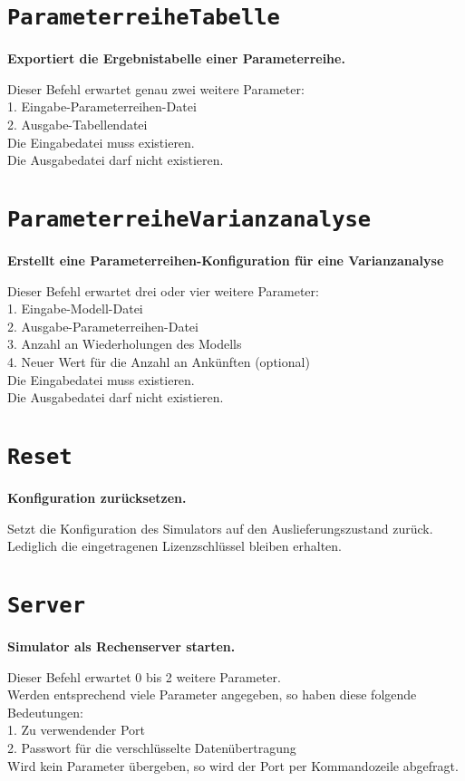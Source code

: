 \section{\texttt{ParameterreiheTabelle}}

\textbf{Exportiert die Ergebnistabelle einer Parameterreihe.}

Dieser Befehl erwartet genau zwei weitere Parameter:\\
1. Eingabe-Parameterreihen-Datei\\
2. Ausgabe-Tabellendatei\\
Die Eingabedatei muss existieren.\\
Die Ausgabedatei darf nicht existieren.

\section{\texttt{ParameterreiheVarianzanalyse}}

\textbf{Erstellt eine Parameterreihen-Konfiguration für eine Varianzanalyse}

Dieser Befehl erwartet drei oder vier weitere Parameter:\\
1. Eingabe-Modell-Datei\\
2. Ausgabe-Parameterreihen-Datei\\
3. Anzahl an Wiederholungen des Modells\\
4. Neuer Wert für die Anzahl an Ankünften (optional)\\
Die Eingabedatei muss existieren.\\
Die Ausgabedatei darf nicht existieren.

\section{\texttt{Reset}}

\textbf{Konfiguration zurücksetzen.}

Setzt die Konfiguration des Simulators auf den Auslieferungszustand zurück.\\
Lediglich die eingetragenen Lizenzschlüssel bleiben erhalten.

\section{\texttt{Server}}

\textbf{Simulator als Rechenserver starten.}

Dieser Befehl erwartet 0 bis 2 weitere Parameter.\\
Werden entsprechend viele Parameter angegeben, so haben diese folgende Bedeutungen:\\
1. Zu verwendender Port\\
2. Passwort für die verschlüsselte Datenübertragung\\
Wird kein Parameter übergeben, so wird der Port per Kommandozeile abgefragt.

